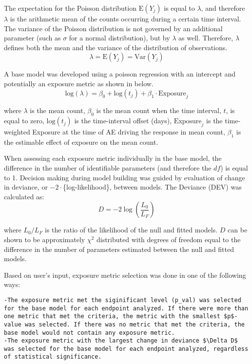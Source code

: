 \documentclass[
]{article}
\begin{document}
The expectation for the Poisson distribution
\(\text{E}\left(Y_{j}\right)\) is equal to \(\lambda\), and therefore
\(\lambda\) is the arithmetic mean of the counts occurring during a
certain time interval. The variance of the Poisson distribution is not
governed by an additional parameter (such as \(\sigma\) for a normal
distribution), but by \(\lambda\) as well. Therefore, \(\lambda\)
defines both the mean and the variance of the distribution of
observations. \begin{equation}
\label{eqn:lambda}
\lambda = \text{E}\left(Y_{j}\right) = \text{Var}\left(Y_{j}\right)
\end{equation}

A base model was developed using a poisson regression with an intercept
and potentially an exposure metric as shown in below. \begin{equation}
\label{eqn:mod}
\text{log}(\lambda) = \beta_{0}+\text{log}\left(t_{j}\right)+\beta_{1}\cdot \text{Exposure}_j
\end{equation}

where \(\lambda\) is the mean count, \(\beta_{0}\) is the mean count
when the time interval, \(t\), is equal to zero,
\(\text{log}\left(t_{j}\right)\) is the time-interval offset (days),
\(\text{Exposure}_j\) is the time-weighted Exposure at the time of AE
driving the response in mean count, \(\beta_{1}\) is the estimable
effect of exposure on the mean count.

When assessing each exposure metric individually in the base model, the
difference in the number of identifiable parameters (and therefore the
\(df\)) is equal to 1. Decision making during model building was guided
by evaluation of change in deviance, or \(-2\cdot\)\{log-likelihood\},
between models. The Deviance (DEV) was calculated as: \newline
\begin{equation}
\label{eqn:dev}
D=-2\log\left(\frac{L_0}{L_F}\right)
\end{equation}

where \(L_0/L_F\) is the ratio of the likelihood of the null and fitted
models. \(D\) can be shown to be approximately \(\chi^2\) distributed
with degrees of freedom equal to the difference in the number of
parameters estimated between the null and fitted models.

Based on user's input, exposure metric selection was done in one of the
following ways:

\begin{verbatim}
-The exposure metric met the siginificant level (p_val) was selected for the base model for each endpoint analyzed. If there were more than one metric that met the criteria, the metric with the smallest $p$-value was selected. If there was no metric that met the criteria, the base model would not contain any exposure metric. 
-The exposure metric with the largest change in deviance $\Delta D$ was selected for the base model for each endpoint analyzed, regardless of statistical significance.
\end{verbatim}
\end{document}
